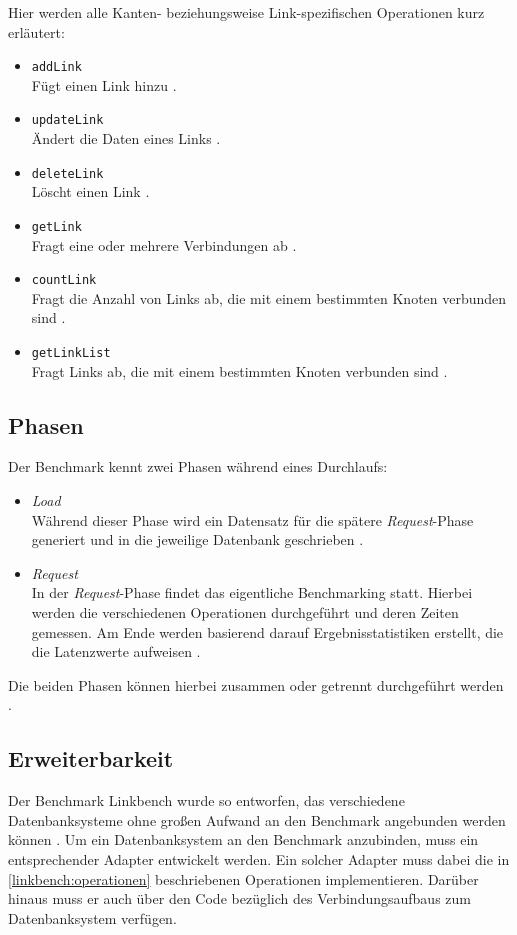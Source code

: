 Hier werden alle Kanten- beziehungsweise Link-spezifischen Operationen kurz erläutert:
\begin{itemize}
    \item \texttt{addLink}\\
    Fügt einen Link hinzu \cite{fb_linkbench_github}.
    \item \texttt{updateLink}\\
    Ändert die Daten eines Links  \cite{fb_linkbench_github}.
    \item \texttt{deleteLink}\\
    Löscht einen Link \cite{fb_linkbench_github}.
    \item \texttt{getLink}\\
    Fragt eine oder mehrere Verbindungen ab \cite{fb_linkbench_github}.
    \item \texttt{countLink}\\
    Fragt die Anzahl von Links ab, die mit einem bestimmten Knoten verbunden sind \cite{fb_linkbench_github}.
    \item \texttt{getLinkList}\\
    Fragt Links ab, die mit einem bestimmten Knoten verbunden sind \cite{fb_linkbench_github}.
\end{itemize}

\subsection{Phasen}
Der Benchmark kennt zwei Phasen während eines Durchlaufs: 
\begin{itemize}
    \item \textit{Load}\\
    Während dieser Phase wird ein Datensatz für die spätere \textit{Request}-Phase generiert und in die jeweilige Datenbank geschrieben \cite{fb_linkbench_github}.
    \item \textit{Request}\\
    In der \textit{Request}-Phase findet das eigentliche Benchmarking statt. Hierbei werden die verschiedenen Operationen durchgeführt und deren Zeiten gemessen. Am Ende werden basierend darauf Ergebnisstatistiken erstellt, die die Latenzwerte aufweisen \cite{fb_linkbench_github}. 
\end{itemize}
Die beiden Phasen können hierbei zusammen oder getrennt durchgeführt werden \cite{fb_linkbench_github}.

\subsection{Erweiterbarkeit}
Der Benchmark Linkbench wurde so entworfen, das verschiedene Datenbanksysteme ohne großen Aufwand an den Benchmark angebunden werden können \cite{linkbench_paper}. Um ein Datenbanksystem an den Benchmark anzubinden, muss ein entsprechender Adapter entwickelt werden. Ein solcher Adapter muss dabei die in \autoref{linkbench:operationen} beschriebenen Operationen implementieren. Darüber hinaus muss er auch über den Code bezüglich des Verbindungsaufbaus zum Datenbanksystem verfügen. 

